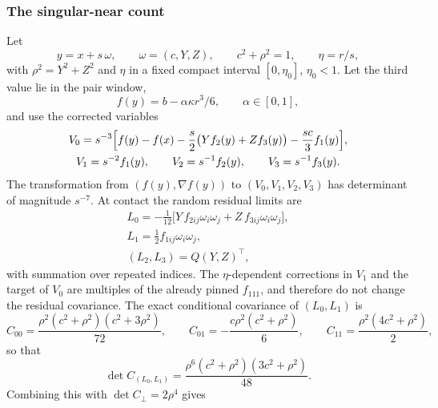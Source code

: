 \subsubsection{The singular-near count}

\begin{lemma}\label{lem:selection-singchart}
Let
\begin{equation}\label{eq:selection-singpt}
y=x+s\,\omega,\qquad\omega=(c,Y,Z),\qquad c^2+\rho^2=1,\qquad\eta=r/s,
\end{equation}
with $\rho^2=Y^2+Z^2$ and $\eta$ in a fixed compact interval $[0,\eta_0]$, $\eta_0<1$. Let the third value lie in the pair window,
\begin{equation}\label{eq:selection-window}
f(y)=b-\alpha\kappa r^3/6,\qquad\alpha\in[0,1],
\end{equation}
and use the corrected variables
\begin{gather}
V_0=s^{-3}\Bigl[f(y)-f(x)-\frac s2\bigl(Yf_2(y)+Zf_3(y)\bigr)-\frac{sc}3f_1(y)\Bigr],\label{eq:selection-V0}\\
V_1=s^{-2}f_1(y),\qquad V_2=s^{-1}f_2(y),\qquad V_3=s^{-1}f_3(y).\label{eq:selection-V123}
\end{gather}
The transformation from $(f(y),\nabla f(y))$ to $(V_0,V_1,V_2,V_3)$ has determinant of magnitude $s^{-7}$. At contact the random residual limits are
\begin{gather}
L_0=-\tfrac1{12}\bigl[Y\,f_{2ij}\omega_i\omega_j+Z\,f_{3ij}\omega_i\omega_j\bigr],\label{eq:selection-L0}\\
L_1=\tfrac12f_{1ij}\omega_i\omega_j,\label{eq:selection-L1s}\\
(L_2,L_3)=Q(Y,Z)^{\top},\label{eq:selection-L23}
\end{gather}
with summation over repeated indices. The $\eta$-dependent corrections in $V_1$ and the target of $V_0$ are multiples of the already pinned $f_{111}$, and therefore do not change the residual covariance. The exact conditional covariance of $(L_0,L_1)$ is
\begin{equation}\label{eq:selection-C01}
C_{00}=\frac{\rho^2(c^2+\rho^2)(c^2+3\rho^2)}{72},\qquad C_{01}=-\frac{c\rho^2(c^2+\rho^2)}6,\qquad C_{11}=\frac{\rho^2(4c^2+\rho^2)}2,
\end{equation}
so that
\begin{equation}\label{eq:selection-det01}
\det C_{(L_0,L_1)}=\frac{\rho^6(c^2+\rho^2)(3c^2+\rho^2)}{48}.
\end{equation}
Combining this with $\det C_\perp=2\rho^4$ gives

\end{lemma}
